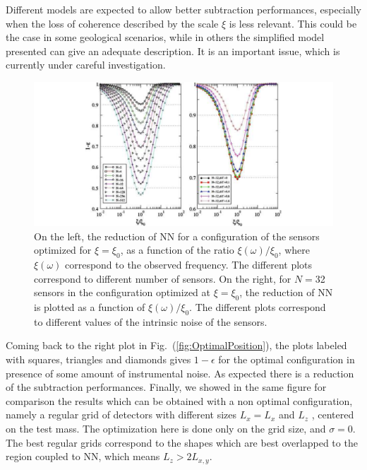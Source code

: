Different models are expected to allow better subtraction performances, especially when the loss of coherence described by the scale $\xi$ is less relevant. This could be the case in some geological scenarios, while in others the simplified model presented can give an adequate description. It is an important issue, which is currently under careful investigation. 
\begin{figure}[t!]
	\begin{center}
		\includegraphics[width=16.5cm]{./Sec_SiteInfra/Figures/SimplOptSens3.pdf}
		\caption{On the left, the reduction of NN for a configuration of the sensors optimized for $\xi=\xi_{0}$, as a function of the ratio $\xi(\omega)/\xi_{0}$, where $\xi(\omega)$ correspond to the observed frequency. The different plots correspond to different number of sensors. On the right, for $N=$32 sensors in the configuration optimized at $\xi=\xi_{0}$, the reduction of NN is plotted as a function of $\xi(\omega)/\xi_{0}$. The different plots correspond to different values of the intrinsic noise of the sensors.}
		\label{fig:OptimalRedution}
	\end{center}
\end{figure}

Coming back to the right plot in Fig.~(\ref{fig:OptimalPosition}), the plots labeled with squares, triangles and diamonds gives $1-\epsilon$ for the optimal configuration in presence of some amount of instrumental noise. As expected there is a reduction of the subtraction performances. Finally, we showed in the same figure for comparison the results which can be obtained with a non optimal configuration, namely a regular grid of detectors with different sizes $L_x = L_x$ and $L_z$ , centered on the test mass. The optimization here is done only on the grid size, and $\sigma = 0$. The best regular grids correspond to the shapes which are best overlapped to the region coupled to NN, which means $L_{z} > 2L_{x, y}$. 

